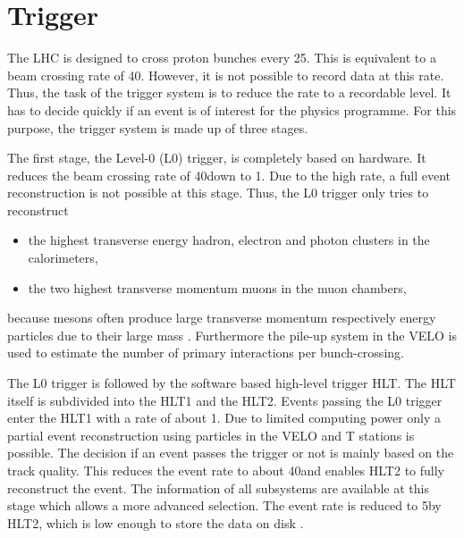 \section{Trigger}
The LHC is designed to cross proton bunches every 25\ns.
This is equivalent to a beam crossing rate of 40\mhz.
However, it is not possible to record data at this rate.
Thus, the task of the \lhcb trigger system is to reduce the rate to a recordable level.
It has to decide quickly if an event is of interest for the \lhcb physics programme.
For this purpose, the trigger system is made up of three stages.

The first stage, the Level-0 (L0) trigger, is completely based on hardware.
It reduces the beam crossing rate of 40\mhz down to 1\mhz.
Due to the high rate, a full event reconstruction is not possible at this stage.
Thus, the L0 trigger only tries to reconstruct
\begin{itemize}
    \item the highest transverse energy \et hadron, electron and photon clusters in the calorimeters,
    \item the two highest transverse momentum muons in the muon chambers,
\end{itemize}
because \B mesons often produce large transverse momentum respectively energy particles due to their large mass \cite{detector}.
Furthermore the pile-up system in the VELO is used to estimate the number of primary \proton\proton interactions per bunch-crossing.

The L0 trigger is followed by the software based high-level trigger HLT.
The HLT itself is subdivided into the HLT1 and the HLT2.
Events passing the L0 trigger enter the HLT1 with a rate of about 1\mhz.
Due to limited computing power only a partial event reconstruction using particles in the VELO and T stations is possible.
The decision if an event passes the trigger or not is mainly based on the track quality.
This reduces the event rate to about 40\khz and enables HLT2 to fully reconstruct the event.
The information of all \lhcb subsystems are available at this stage which allows a more advanced selection.
The event rate is reduced to 5\khz by HLT2, which is low enough to store the data on disk \cite{detector, Trigger, Trigger_Performance_2011}.

